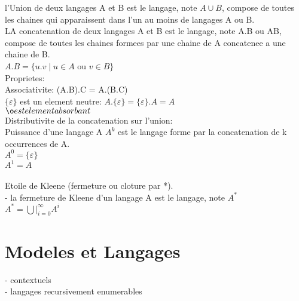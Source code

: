 \documentclass{article}
\begin{document}
l'Union de deux langages A et B est le langage, note $A \cup B$, compose de toutes les chaines qui apparaissent dans l'un au moins de langages A ou B.\\

LA concatenation de deux langages A et B est le langage, note A.B ou AB, compose de toutes les chaines formees par une chaine de A concatenee a une chaine de B.\\
$A.B = \{u.v \mid u \in A$ ou $ v \in B\}$\\

Proprietes:\\
Associativite: (A.B).C = A.(B.C) \\
$\{\varepsilon\}$ est un element neutre: $A.\{\varepsilon\} = \{\varepsilon\}.A = A$\\
$\o est element absorbant$\\
Distributivite de la concatenation sur l'union:\\

Puissance d'une langage A
$A^k$ est le langage forme par la concatenation de k occurrences de A.\\
$A^0 = \{\varepsilon\}$\\
$A^1 = A$\\
\\

Etoile de Kleene (fermeture ou cloture par *).\\
- la fermeture de Kleene d'un langage A est le langage, note $A^*$\\
$A^* = \bigcup|_{i=0}^\infty A^i$\\



\section{Modeles et Langages}
- contextuels\\
- langages recursivement enumerables\\
\end{document}
